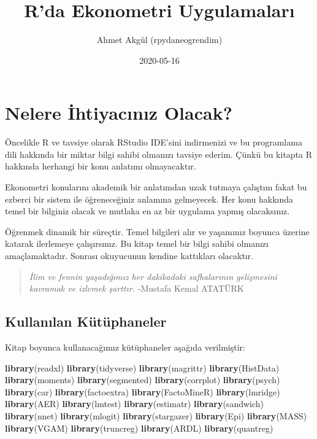 \documentclass[
]{book}
\title{R'da Ekonometri Uygulamaları}
\author{Ahmet Akgül (rpydaneogrendim)}
\date{2020-05-16}
\newenvironment{Shaded}{\begin{snugshade}}{\end{snugshade}}
\newcommand{\KeywordTok}[1]{\textcolor[rgb]{0.13,0.29,0.53}{\textbf{#1}}}
\newcommand{\NormalTok}[1]{#1}
\begin{document}
\maketitle

{
\setcounter{tocdepth}{1}
\tableofcontents
}
\hypertarget{nelere-ihtiyacux131nux131z-olacak}{%
\chapter{Nelere İhtiyacınız Olacak?}\label{nelere-ihtiyacux131nux131z-olacak}}

Öncelikle R ve tavsiye olarak RStudio IDE'sini indirmenizi ve bu programlama dili hakkında bir miktar bilgi sahibi olmanızı tavsiye ederim. Çünkü bu kitapta R hakkında herhangi bir konu anlatımı olmayacaktır.

Ekonometri konularını akademik bir anlatımdan uzak tutmaya çalıştım fakat bu ezberci bir sistem ile öğreneceğiniz anlamına gelmeyecek. Her konu hakkında temel bir bilginiz olacak ve mutlaka en az bir uygulama yapmış olacaksınız.

Öğrenmek dinamik bir süreçtir. Temel bilgileri alır ve yaşamınız boyunca üzerine katarak ilerlemeye çalışırsınız. Bu kitap temel bir bilgi sahibi olmanızı amaçlamaktadır. Sonrası okuyucunun kendine kattıkları olacaktır.

\begin{quote}
\emph{İlim ve fennin yaşadığımız her dakikadaki safhalarının gelişmesini kavramak ve izlemek şarttır.} -Mustafa Kemal ATATÜRK
\end{quote}

\hypertarget{kullanux131lan-kuxfctuxfcphaneler}{%
\section{Kullanılan Kütüphaneler}\label{kullanux131lan-kuxfctuxfcphaneler}}

Kitap boyunca kullanacağımız kütüphaneler aşağıda verilmiştir:

\begin{Shaded}
\begin{Highlighting}[]
\KeywordTok{library}\NormalTok{(readxl)}
\KeywordTok{library}\NormalTok{(tidyverse)}
\KeywordTok{library}\NormalTok{(magrittr)}
\KeywordTok{library}\NormalTok{(HistData)}
\KeywordTok{library}\NormalTok{(moments)}
\KeywordTok{library}\NormalTok{(segmented)}
\KeywordTok{library}\NormalTok{(corrplot)}
\KeywordTok{library}\NormalTok{(psych)}
\KeywordTok{library}\NormalTok{(car)}
\KeywordTok{library}\NormalTok{(factoextra)}
\KeywordTok{library}\NormalTok{(FactoMineR)}
\KeywordTok{library}\NormalTok{(lmridge)}
\KeywordTok{library}\NormalTok{(AER)}
\KeywordTok{library}\NormalTok{(lmtest)}
\KeywordTok{library}\NormalTok{(estimatr)}
\KeywordTok{library}\NormalTok{(sandwich)}
\KeywordTok{library}\NormalTok{(nnet)}
\KeywordTok{library}\NormalTok{(mlogit)}
\KeywordTok{library}\NormalTok{(stargazer)}
\KeywordTok{library}\NormalTok{(Epi)}
\KeywordTok{library}\NormalTok{(MASS)}
\KeywordTok{library}\NormalTok{(VGAM)}
\KeywordTok{library}\NormalTok{(truncreg)}
\KeywordTok{library}\NormalTok{(ARDL)}
\KeywordTok{library}\NormalTok{(quantreg)}
\end{Highlighting}
\end{Shaded}
\end{document}

